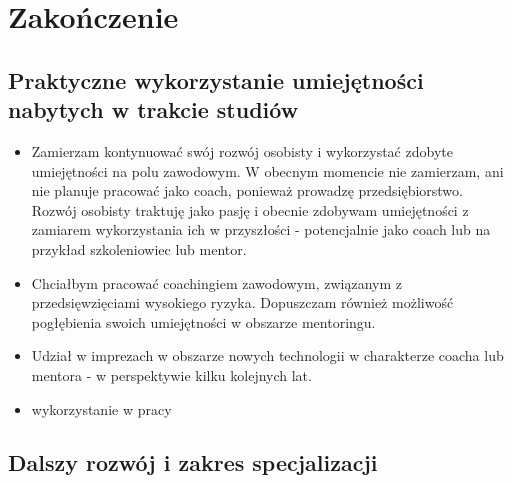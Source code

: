\chapter{Zakończenie}

\section{Praktyczne wykorzystanie umiejętności nabytych w trakcie studiów}


\begin{itemize}
  \item Zamierzam kontynuować swój rozwój osobisty i wykorzystać zdobyte umiejętności na polu zawodowym. W obecnym momencie
    nie zamierzam, ani nie planuje pracować jako coach, ponieważ prowadzę przedsiębiorstwo. Rozwój osobisty traktuję jako pasję
    i obecnie zdobywam umiejętności z zamiarem wykorzystania ich w przyszłości - potencjalnie jako coach lub na przykład szkoleniowiec
    lub mentor.
  \item Chciałbym pracować coachingiem zawodowym, związanym z przedsięwzięciami wysokiego ryzyka. Dopuszczam również
    możliwość pogłębienia swoich umiejętności w obszarze mentoringu.
  \item Udział w imprezach w obszarze nowych technologii w charakterze coacha lub mentora - w perspektywie kilku kolejnych lat.
  \item wykorzystanie w pracy
\end{itemize}

\section{Dalszy rozwój i zakres specjalizacji}
